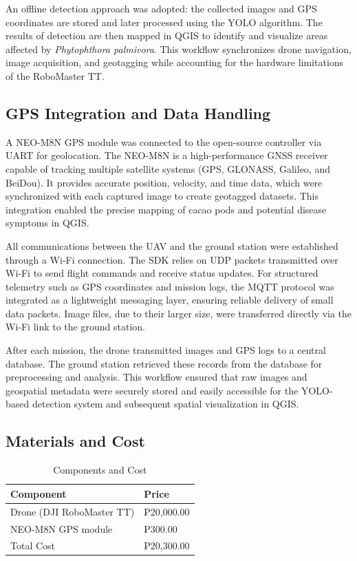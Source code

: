 An offline detection approach was adopted: the collected images and GPS coordinates are stored
and later processed using the YOLO algorithm. The results of detection are then mapped in QGIS
to identify and visualize areas affected by \textit{Phytophthora palmivora}. This workflow
synchronizes drone navigation, image acquisition, and geotagging while accounting for the
hardware limitations of the RoboMaster TT.

\subsection{GPS Integration and Data Handling}
A NEO-M8N GPS module was connected to the open-source controller via UART for geolocation.
The NEO-M8N is a high-performance GNSS receiver capable of tracking multiple satellite systems
(GPS, GLONASS, Galileo, and BeiDou). It provides accurate position, velocity, and time data,
which were synchronized with each captured image to create geotagged datasets. This integration
enabled the precise mapping of cacao pods and potential disease symptoms in QGIS.

All communications between the UAV and the ground station were established through a
Wi-Fi connection. The SDK relies on UDP packets transmitted over Wi-Fi to send
flight commands and receive status updates. For structured telemetry such as GPS coordinates
and mission logs, the MQTT protocol was integrated as a lightweight messaging layer,
ensuring reliable delivery of small data packets. Image files, due to their larger size, were
transferred directly via the Wi-Fi link to the ground station.

After each mission, the drone transmitted images and GPS logs to a central database.
The ground station retrieved these records from the database for preprocessing
and analysis. This workflow ensured that raw images and geospatial metadata were securely
stored and easily accessible for the YOLO-based detection system and subsequent
spatial visualization in QGIS.


\subsection{Materials and Cost}

\begin{table}[H]
	\centering
	\caption{Components and Cost}
	\label{tab:components}
	\begin{tabular}{ll}
		\toprule
		Component                 & Price      \\
		\midrule
		Drone (DJI RoboMaster TT) & ₱20,000.00 \\
		\midrule
		NEO-M8N GPS module        & ₱300.00    \\
		\midrule
		Total Cost                & ₱20,300.00 \\
		\bottomrule
	\end{tabular}
\end{table}

